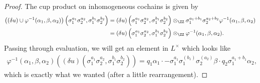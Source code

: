 \documentclass{article}
\begin{document}
\begin{proof}
	The cup product on inhomogeneous cochains is given by
	\begin{align*}
		\big((\delta u)\cup\varphi^{-1}(\alpha_1,\beta,\alpha_2)\big)\left(\sigma_1^{a_1}\sigma_2^{a_2},\sigma_1^{b_1}\sigma_2^{b_2}\right) &= (\delta u)\left(\sigma_1^{a_1}\sigma_2^{a_2},\sigma_1^{b_1}\sigma_2^{b_2}\right)\otimes_\ZZ\sigma_1^{a_1+b_1}\sigma_2^{a_2+b_2}\varphi^{-1}(\alpha_1,\beta,\alpha_2) \\
		&= (\delta u)\left(\sigma_1^{a_1}\sigma_2^{a_2},\sigma_1^{b_1}\sigma_2^{b_2}\right)\otimes_\ZZ\varphi^{-1}(\alpha_1,\beta,\alpha_2).
	\end{align*}
	Passing through evaluation, we will get an element in $L^\times$ which looks like
	\begin{align*}
		\varphi^{-1}(\alpha_1,\beta,\alpha_2)\left((\delta u)\left(\sigma_1^{a_1}\sigma_2^{a_2},\sigma_1^{b_1}\sigma_2^{b_2}\right)\right)=q_1\alpha_1\cdot-\sigma_1^{a_1}\sigma_1^{(b_1)}\sigma_2^{(a_2)}\beta\cdot q_2\sigma_1^{a_1+b_1}\alpha_2,
	\end{align*}
	which is exactly what we wanted (after a little rearrangement).
\end{proof}
\end{document}
